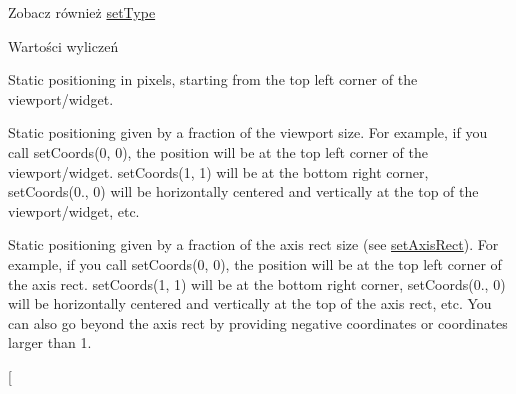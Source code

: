 \begin{DoxySeeAlso}{Zobacz również}
\hyperlink{class_q_c_p_item_position_aa476abf71ed8fa4c537457ebb1a754ad}{set\+Type} 
\end{DoxySeeAlso}
\begin{Desc}
\item[Wartości wyliczeń]\par
\begin{description}
\item[{\em 
pt\+Absolute\hypertarget{class_q_c_p_item_position_aad9936c22bf43e3d358552f6e86dbdc8a564f5e53e550ead1ec5fc7fc7d0b73e0}{}\label{class_q_c_p_item_position_aad9936c22bf43e3d358552f6e86dbdc8a564f5e53e550ead1ec5fc7fc7d0b73e0}
}]Static positioning in pixels, starting from the top left corner of the viewport/widget. \item[{\em 
pt\+Viewport\+Ratio\hypertarget{class_q_c_p_item_position_aad9936c22bf43e3d358552f6e86dbdc8ac7d6aa89ceacb39658b0d6da061c789a}{}\label{class_q_c_p_item_position_aad9936c22bf43e3d358552f6e86dbdc8ac7d6aa89ceacb39658b0d6da061c789a}
}]Static positioning given by a fraction of the viewport size. For example, if you call set\+Coords(0, 0), the position will be at the top left corner of the viewport/widget. set\+Coords(1, 1) will be at the bottom right corner, set\+Coords(0., 0) will be horizontally centered and vertically at the top of the viewport/widget, etc. \item[{\em 
pt\+Axis\+Rect\+Ratio\hypertarget{class_q_c_p_item_position_aad9936c22bf43e3d358552f6e86dbdc8a01080fd00eaf09fa238ef6b73bbfef75}{}\label{class_q_c_p_item_position_aad9936c22bf43e3d358552f6e86dbdc8a01080fd00eaf09fa238ef6b73bbfef75}
}]Static positioning given by a fraction of the axis rect size (see \hyperlink{class_q_c_p_item_position_a0cd9b326fb324710169e92e8ca0041c2}{set\+Axis\+Rect}). For example, if you call set\+Coords(0, 0), the position will be at the top left corner of the axis rect. set\+Coords(1, 1) will be at the bottom right corner, set\+Coords(0., 0) will be horizontally centered and vertically at the top of the axis rect, etc. You can also go beyond the axis rect by providing negative coordinates or coordinates larger than 1. \item[{\em 
}
\end{description}
\end{Desc}
